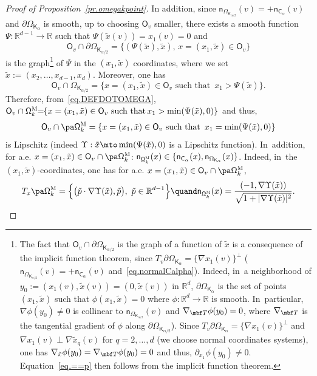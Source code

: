 \begin{proof}[Proof of Proposition~\ref{pr.omegakpoint}]
In addition, since $\mathsf n_{\Omega_{\mathsf K_{\alpha/2}}}(v)= +\mathsf n_{\mathsf C_\alpha}(v)$ and $\partial \Omega_{\mathsf K_\alpha}$ is smooth, up to choosing $\mathsf O_v$ smaller, there exists a smooth function $\Psi: \mathbb R^{d-1} \to \mathbb R$ such that $\Psi(\tilde x(v))=x_1(v)=0$ and
\begin{equation}\label{eq.==p}
\mathsf O_v\cap \partial \Omega_{\mathsf K_{\alpha/2}}=\{(\Psi(\tilde x), \tilde x), \, x=(x_1,\tilde x)\in \mathsf O_v\}
\end{equation}
is the graph\footnote{The
fact that $\mathsf O_v\cap \partial \Omega_{\mathsf
K_{\alpha/2}}$ is the graph of a function of $\tilde x$ is a
consequence of the implicit function theorem, since $T_v\partial \Omega_{\mathsf K_\alpha}= \{\nabla {x_1}(v)\}^\bot$ ($\mathsf n_{\Omega_{\mathsf K_{\alpha/2}}}(v)= +\mathsf n_{\mathsf C_\alpha}(v)$ and~\eqref{eq.normalCalpha}). Indeed, in~a neighborhood of $y_0:=(x_1(v), \tilde x(v))=(0,\tilde x(v))$ in $\mathbb R^d$, $\partial \Omega_{\mathsf K_\alpha}$ is the set of points $(x_1,\tilde x)$ such that $\phi(x_1,\tilde x)=0$ where $\phi:\mathbb R^d\to \mathbb R$ is smooth. In~particular, $\nabla \phi(y_0)\neq 0$ is collinear to $\mathsf n_{\Omega_{\mathsf K_{\alpha/2}}}(v)$ and $\nabla_{\mbf T}\phi(y_0)=0$, where $\nabla_{\mbf T}$ is the tangential gradient of $\phi$ along $\partial \Omega_{\mathsf K_{\alpha/2}}$). Since $T_v\partial \Omega_{\mathsf K_\alpha}= \{\nabla {x_1}(v)\}^\bot$ and $\nabla {x_1}(v)\perp \nabla {\tilde x_q}(v)$ for $q=2,\ldots,d$ (we choose normal coordinates systems), one has $\nabla_{\tilde x}\phi(y_0)=\nabla_{\mbf T}\phi(y_0)=0$ and thus, $\partial_{x_1}\phi(y_0)\neq 0$. Equation~\eqref{eq.==p} then follows from the implicit function theorem.} of $\Psi$ in the $(x_1,\tilde x)$ coordinates, where
we set $\tilde x:=(x_2,\ldots, x_{d-1},x_d)$.
Moreover, one has
\[
\mathsf O_v\cap \Omega_{\mathsf K_{\alpha/2}}=\{x=(x_1,\tilde x)\in \mathsf O_v \text{ such that } \, x_1>\Psi(\tilde x)\}.
\]
Therefore, from~\eqref{eq.DEFDOTOMEGA},
$ \mathsf O_v\cap \mathsf \Omega_k^{\textsc{M}}\!\! =\!\! \{x=(x_1,\tilde x)\in \mathsf O_v \text{ such that} \, x_1>\min(\Psi(\tilde x),0)\}
$ and thus,
\[
\mathsf O_v\cap \pa \mathsf \Omega_k^{\textsc{M}} =\{x=(x_1,\tilde x)\in \mathsf O_v \text{ such that } \, x_1=\min(\Psi(\tilde x),0)\}
\]
is Lipschitz (indeed $\Upsilon: \tilde x\mto \min(\Psi(\tilde x),0)$ is a Lipschitz function). In~addition, for a.e. $x=(x_1,\tilde x)\in \mathsf O_v\cap \pa \mathsf \Omega_k^{\textsc{M}}$: $\mathsf n_{\mathsf \Omega_k^{\textsc{M}}}(x)\in \{ \mathsf n_{ \mathsf C_\alpha }(x), \mathsf n_{ \Omega_{\mathsf K_\alpha} }(x)\}$. Indeed, in~the $(x_1,\tilde x)$-coordinates, one has for a.e. $x=(x_1,\tilde x)\in \mathsf O_v\cap \pa \mathsf \Omega_k^{\textsc{M}}$,
\[
T_x \pa \mathsf \Omega_k^{\textsc{M}}=\Big\{\bigl(\tilde p\cdot \nabla \Upsilon (\tilde x), \tilde p\bigr), \ \tilde p \in \mathbb R^{d-1}\Big\} \quand \mathsf n_{\mathsf \Omega_k^{\textsc{M}}}(x)=\frac{(-1, \nabla \Upsilon (\tilde x))}{\sqrt{1+ \vert \nabla\Upsilon (\tilde x)\vert^2 }}.
\]


\end{proof}
